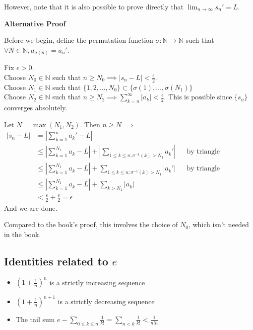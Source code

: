 \documentclass{article}
\begin{document}
However, note that it is also possible to prove directly that $\lim_{n\rightarrow \infty} s_n' = L$.

\textbf{Alternative Proof}

Before we begin, define the permutation function $\sigma: \mathbb{N}\rightarrow \mathbb{N}$ such that $\forall N\in \mathbb{N}, a_{\sigma(n)}=a_n'$.

Fix $\epsilon > 0$. \\
Choose $N_0\in \mathbb{N}$ such that $n\geq N_0\implies |s_n - L| < \frac{\epsilon}{2}$.\\
Choose $N_1\in \mathbb{N}$ such that $\{1, 2, \dots, N_0\}\subset \{\sigma(1),\dots, \sigma(N_1)\}$\\
Choose $N_2\in \mathbb{N}$ such that $n\geq N_2\implies \sum_{k=n}^\infty |a_k|<\frac{\epsilon}{2}$. This is possible since $\{s_n\}$ converges absolutely.

Let $N=\max(N_1, N_2)$. Then $n\geq N\implies$
\begin{align*}
	|s_n - L| &= |\sum_{k=1}^n a_k' - L|\\
	&\leq |\sum_{k=1}^{N_1} a_k - L| + |\sum_{1\leq k\leq n; \sigma^{-1}(k) > N_1}a_k'| &&\text{by triangle inequality} \\
	&\leq |\sum_{k=1}^{N_1} a_k - L| + \sum_{1\leq k\leq n; \sigma^{-1}(k) > N_1}|a_k'| &&\text{by triangle inequality} \\
	&\leq |\sum_{k=1}^{N_1} a_k - L| + \sum_{k > N_1}|a_k|\\
	&< \frac{\epsilon}{2} + \frac{\epsilon}{2} = \epsilon
\end{align*}
And we are done.

Compared to the book's proof, this involves the choice of $N_0$, which isn't needed in the book.


\subsection{Identities related to $e$}
\begin{itemize}
	\item $(1+\frac{1}{n})^n$ is a strictly increasing sequence
	\item $(1+\frac{1}{n})^{n+1}$ is a strictly decreasing sequence
	\item The tail sum $e-\sum_{0\leq k\leq n}\frac{1}{k!}=\sum_{n<k}\frac{1}{k!}<\frac{1}{n!n}$
\end{itemize}
\end{document}
